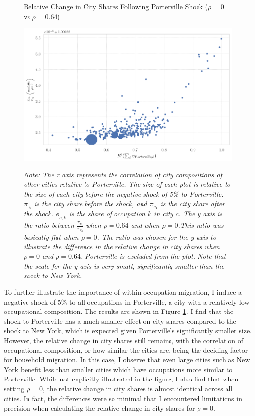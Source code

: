 \documentclass[10pt]{article}
\begin{document}
\begin{figure}[!htb]
    \centering
    \caption{Relative Change in City Shares Following Porterville Shock ($\rho = 0$ vs $\rho = 0.64$)}
    \includegraphics[width=\textwidth]{../../estimations/graphs/city_shock_s.png}
    \label{vp_change_graph}
    \caption*{\small\textit{Note: The x axis represents the correlation of city compositions of other cities relative to Porterville. The size of each plot is relative to the size of each city before the negative shock of 5\% to Porterville. $\pi_{c_0}$ is the city share before the shock, and $\pi_{c_1}$ is the city share after the shock. $\phi_{c, k}$ is the share of occupation $k$ in city $c$. The y axis is the ratio between $\frac{\pi_{c_1}}{\pi_{c_0}}$ when $\rho = 0.64$ and when $\rho = 0$.This ratio was basically flat when $\rho = 0$. The ratio was chosen for the y axis to illustrate the difference in the relative change in city shares when $\rho = 0$ and $\rho = 0.64$. Porterville is excluded from the plot. Note that the scale for the y axis is very small, significantly smaller than the shock to New York.}}
\end{figure}

To further illustrate the importance of within-occupation migration, I induce a negative shock of 5\% to all occupations in Porterville, a city with a relatively low occupational composition. The results are shown in Figure \ref{vp_change_graph}. I find that the shock to Porterville has a much smaller effect on city shares compared to the shock to New York, which is expected given Porterville's significantly smaller size. However, the relative change in city shares still remains, with the correlation of occupational composition, or how similar the cities are, being the deciding factor for household migration. In this case, I observe that even large cities such as New York benefit less than smaller cities which have occupations more similar to Porterville. While not explicitly illustrated in the figure, I also find that when setting $\rho = 0$, the relative change in city shares is almost identical across all cities. In fact, the differences were so minimal that I encountered limitations in precision when calculating the relative change in city shares for $\rho = 0$.
\end{document}

